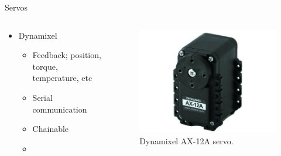 \documentclass{beamer}
\begin{document}
\begin{frame}{Servos}

    \begin{columns}
        \begin{column}[]{0.5\textwidth}
            \begin{itemize}
                \item Dynamixel
                \begin{itemize}
                    \item Feedback; position, torque, temperature, etc
                    \item Serial communication
                    \item Chainable
                    \item
                \end{itemize}
            \end{itemize}
        \end{column}
        
        
        \begin{column}[]{0.5\textwidth}
            \begin{figure}
                \centering
                \includegraphics[width = \textwidth]{img/ax12a.jpg}
                \caption{Dynamixel AX-12A servo.}
                \label{fig:my_label}
            \end{figure}
            
        \end{column}
    \end{columns}
    
\end{frame}
\end{document}
